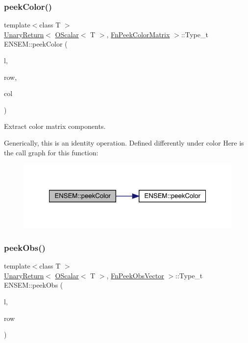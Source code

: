 \subsubsection{\texorpdfstring{peekColor()}{peekColor()}\hspace{0.1cm}{\footnotesize\ttfamily [2/2]}}
{\footnotesize\ttfamily template$<$class T $>$ \\
\mbox{\hyperlink{structENSEM_1_1UnaryReturn}{Unary\+Return}}$<$ \mbox{\hyperlink{classENSEM_1_1OScalar}{O\+Scalar}}$<$ T $>$, \mbox{\hyperlink{structENSEM_1_1FnPeekColorMatrix}{Fn\+Peek\+Color\+Matrix}} $>$\+::Type\+\_\+t E\+N\+S\+E\+M\+::peek\+Color (\begin{DoxyParamCaption}\item[{const \mbox{\hyperlink{classENSEM_1_1OScalar}{O\+Scalar}}$<$ T $>$ \&}]{l,  }\item[{int}]{row,  }\item[{int}]{col }\end{DoxyParamCaption})\hspace{0.3cm}{\ttfamily [inline]}}



Extract color matrix components. 

Generically, this is an identity operation. Defined differently under color Here is the call graph for this function\+:\nopagebreak
\begin{figure}[H]
\begin{center}
\leavevmode
\includegraphics[width=321pt]{d1/d71/group__obsscalar_gabb496d1fb0c0682ec483697e6dae0e32_cgraph}
\end{center}
\end{figure}
\mbox{\label{group__obsscalar_ga39239dd32aa731cde63bf4ecdafd30a4}} 
\subsubsection{\texorpdfstring{peekObs()}{peekObs()}}
{\footnotesize\ttfamily template$<$class T $>$ \\
\mbox{\hyperlink{structENSEM_1_1UnaryReturn}{Unary\+Return}}$<$ \mbox{\hyperlink{classENSEM_1_1OScalar}{O\+Scalar}}$<$ T $>$, \mbox{\hyperlink{structENSEM_1_1FnPeekObsVector}{Fn\+Peek\+Obs\+Vector}} $>$\+::Type\+\_\+t E\+N\+S\+E\+M\+::peek\+Obs (\begin{DoxyParamCaption}\item[{const \mbox{\hyperlink{classENSEM_1_1OScalar}{O\+Scalar}}$<$ T $>$ \&}]{l,  }\item[{int}]{row }\end{DoxyParamCaption})\hspace{0.3cm}{\ttfamily [inline]}}

